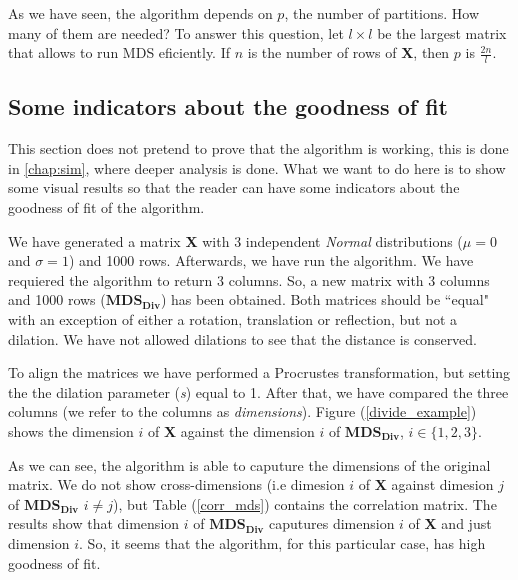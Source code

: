 \documentclass[11pt]{report}
\begin{document}
As we have seen, the algorithm depends on $p$, the number of partitions. How 
many of them are needed? To answer this question, let $l \times l$ be the largest 
matrix that allows to run MDS eficiently. If $n$ is the number of rows 
of \textbf{X}, then $p$ is $\frac{2n}{l}$. 

\subsection{Some indicators about the goodness of fit}
\label{chap:ind_div}
This section does not pretend to prove that the algorithm is working, this is 
done in \autoref{chap:sim}, where deeper analysis is done. What we want 
to do here is to show some visual results so that the reader can have some 
indicators about the goodness of fit of the algorithm. 

\indent We have generated a matrix \textbf{X} with 3 independent \textit{Normal} 
distributions ($\mu = 0$ and $\sigma = 1$) and 1000 rows. Afterwards, 
we have run the algorithm. We have requiered the algorithm to return 3 columns. 
So, a new matrix with 3 columns and 1000 rows ($\mathbf{MDS_{Div}}$) 
has been obtained. Both matrices should be ``equal" with an exception of either
a rotation, translation or reflection, but not a dilation. We have not
allowed dilations to see that the distance is conserved.

\indent To align the matrices we have performed a Procrustes transformation, but 
setting the the dilation parameter (\textit{s}) equal to 1. 
After that, we have compared the three columns (we refer to the columns as 
\textit{dimensions}). Figure (\ref{divide_example}) shows the dimension
$i$ of \textbf{X} against the dimension $i$ of $\mathbf{MDS_{Div}}$, 
$i \in \{1,2,3\}$. 

\indent As we can see, the algorithm is able to caputure the dimensions of the 
original matrix. We do not show cross-dimensions (i.e dimesion $i$ of \textbf{X}
against dimesion $j$ of $\mathbf{MDS_{Div}}$ $ i \neq j$), but Table 
(\ref{corr_mds}) contains the correlation matrix. The results 
show that dimension  $i$ of  $\mathbf{MDS_{Div}}$ caputures dimension 
$i$ of \textbf{X} and just dimension $i$. So, it seems that the algorithm, for 
this particular case, has high goodness of fit.
\end{document}
